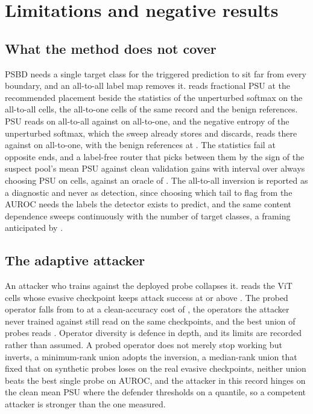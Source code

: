 \documentclass[../main.tex]{subfiles}
\begin{document}
\section{Limitations and negative results}
\label{sec:limitations}

\subsection{What the method does not cover}

PSBD needs a single target class for the triggered prediction to sit far from every boundary, and an all-to-all label map removes it.  reads fractional PSU at the recommended placement beside the statistics of the unperturbed softmax on the \ATwoaCells{} all-to-all cells, the all-to-one cells of the same record and the benign references. PSU reads \ATwoaPsuAuroc{} on all-to-all against \ATwooPsuAuroc{} on all-to-one, and the negative entropy of the unperturbed softmax, which the sweep already stores and discards, reads \ATwoaEntropyAuroc{} there against \ATwooEntropyAuroc{} on all-to-one, with the benign references at \BenignEntropyAuroc{}. The statistics fail at opposite ends, and a label-free router that picks between them by the sign of the suspect pool's mean PSU against clean validation gains \RouterDelta{} with interval \RouterDeltaCi{} over always choosing PSU on \RouterCells{} cells, against an oracle of \RouterOracle{}. The all-to-all inversion is reported as a diagnostic and never as detection, since choosing which tail to flag from the AUROC needs the labels the detector exists to predict, and the same content dependence sweeps continuously with the number of target classes, a framing anticipated by \citet{wang2025a2x}.



\subsection{The adaptive attacker}

An attacker who trains against the deployed probe collapses it.  reads the \AdaptiveVitCells{} ViT cells whose evasive checkpoint keeps attack success at or above \AdaptiveHighAsr{}. The probed operator falls from \AdaptiveVitProbedBase{} to \AdaptiveVitProbedEvade{} at a clean-accuracy cost of \AdaptiveVitCaCost{}, the operators the attacker never trained against still read \AdaptiveVitTransfer{} on the same checkpoints, and the best union of probes reads \AdaptiveVitUnion{}. Operator diversity is defence in depth, and its limits are recorded rather than assumed. A probed operator does not merely stop working but inverts, a minimum-rank union adopts the inversion, a median-rank union that fixed that on synthetic probes loses on the real evasive checkpoints, neither union beats the best single probe on AUROC, and the attacker in this record hinges on the clean mean PSU where the defender thresholds on a quantile, so a competent attacker is stronger than the one measured.
\end{document}
